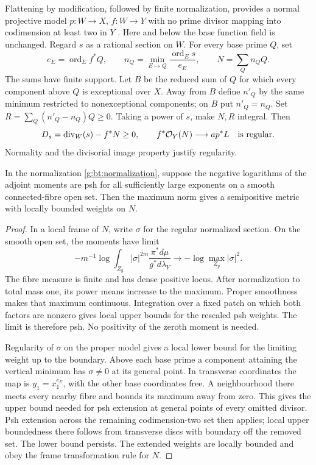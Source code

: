 Flattening by modification, followed by finite normalization, provides
a normal projective model $p:W\to X$, $f:W\to Y$ with no prime divisor
mapping into codimension at least two in $Y$ \cite{RaynaudGruson1971}.
Here and below the base function field is unchanged.
Regard $s$ as a rational section on $W$.  For every base prime $Q$, set
\[
 e_E=\operatorname{ord}_E f^*Q,\qquad
 n_Q=\min_{E\mapsto Q}\frac{\operatorname{ord}_E s}{e_E},
 \qquad N=\sum_Q n_Q Q.
\]
The sums have finite support.  Let $B$ be the reduced sum of $Q$ for
which every component above $Q$ is exceptional over $X$.  Away from $B$
define $n'_Q$ by the same minimum restricted to nonexceptional components;
on $B$ put $n'_Q=n_Q$.  Set $R=\sum_Q(n'_Q-n_Q)Q\geq0$.
Taking a power of $s$, make $N,R$ integral.  Then
\begin{equation}\label{g:bt:normalization}
 D_s=\operatorname{div}_W(s)-f^*N\geq0,\qquad
       f^*\mathcal O_Y(N)\longrightarrow a p^*L
       \quad\hbox{is regular}.
\end{equation}
Normality and the divisorial image property justify regularity.

\begin{lemma}
\label{g:bt:bounded-maximum}
In the normalization \eqref{g:bt:normalization}, suppose the negative
logarithms of the adjoint moments are psh for all sufficiently large
exponents on a smooth connected-fibre open set.
Then the maximum norm gives a semipositive metric with locally bounded
weights on $N$.
\end{lemma}

\begin{proof}
In a local frame of $N$, write $\sigma$ for the regular normalized
section.  On the smooth open set, the moments have limit
\[
 -m^{-1}\log\int_{Z_y}|\sigma|^{2m}
                \frac{\pi^*d\mu}{g^*d\lambda_Y}
                     \longrightarrow-\log\max_{Z_y}|\sigma|^2.
\]
The fibre measure is finite and has dense positive locus.
After normalization to total mass one, its power means increase to
the maximum.  Proper smoothness makes that maximum continuous.
Integration over a fixed patch on which both factors are nonzero
gives local upper bounds for the rescaled psh weights.  The limit is
therefore psh.  No positivity of the zeroth moment is needed.

Regularity of $\sigma$ on the proper model gives a local lower bound
for the limiting weight up to the boundary.
Above each base prime a component attaining the vertical minimum has
$\sigma\ne0$ at its general point.  In transverse coordinates the map
is $y_1=x_1^{e_E}$, with the other base coordinates free.  A neighbourhood
there meets every nearby fibre and bounds its maximum away from zero.
This gives the upper bound needed for psh extension at general points
of every omitted divisor.  Psh extension across the remaining
codimension-two set then applies; local upper boundedness there follows
from transverse discs with boundary off the removed set.  The lower
bound persists.  The extended weights are locally bounded and obey the
frame transformation rule for $N$.
\end{proof}


